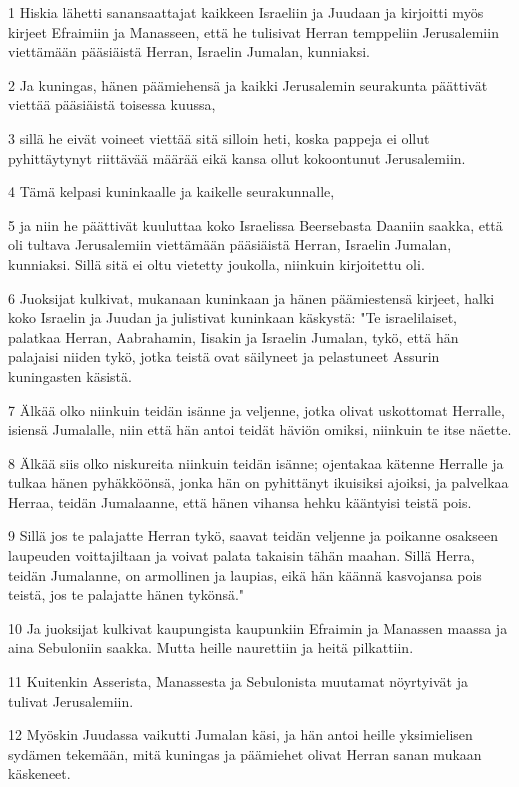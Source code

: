 \par 1 Hiskia lähetti sanansaattajat kaikkeen Israeliin ja Juudaan ja kirjoitti myös kirjeet Efraimiin ja Manasseen, että he tulisivat Herran temppeliin Jerusalemiin viettämään pääsiäistä Herran, Israelin Jumalan, kunniaksi.
\par 2 Ja kuningas, hänen päämiehensä ja kaikki Jerusalemin seurakunta päättivät viettää pääsiäistä toisessa kuussa,
\par 3 sillä he eivät voineet viettää sitä silloin heti, koska pappeja ei ollut pyhittäytynyt riittävää määrää eikä kansa ollut kokoontunut Jerusalemiin.
\par 4 Tämä kelpasi kuninkaalle ja kaikelle seurakunnalle,
\par 5 ja niin he päättivät kuuluttaa koko Israelissa Beersebasta Daaniin saakka, että oli tultava Jerusalemiin viettämään pääsiäistä Herran, Israelin Jumalan, kunniaksi. Sillä sitä ei oltu vietetty joukolla, niinkuin kirjoitettu oli.
\par 6 Juoksijat kulkivat, mukanaan kuninkaan ja hänen päämiestensä kirjeet, halki koko Israelin ja Juudan ja julistivat kuninkaan käskystä: "Te israelilaiset, palatkaa Herran, Aabrahamin, Iisakin ja Israelin Jumalan, tykö, että hän palajaisi niiden tykö, jotka teistä ovat säilyneet ja pelastuneet Assurin kuningasten käsistä.
\par 7 Älkää olko niinkuin teidän isänne ja veljenne, jotka olivat uskottomat Herralle, isiensä Jumalalle, niin että hän antoi teidät häviön omiksi, niinkuin te itse näette.
\par 8 Älkää siis olko niskureita niinkuin teidän isänne; ojentakaa kätenne Herralle ja tulkaa hänen pyhäkköönsä, jonka hän on pyhittänyt ikuisiksi ajoiksi, ja palvelkaa Herraa, teidän Jumalaanne, että hänen vihansa hehku kääntyisi teistä pois.
\par 9 Sillä jos te palajatte Herran tykö, saavat teidän veljenne ja poikanne osakseen laupeuden voittajiltaan ja voivat palata takaisin tähän maahan. Sillä Herra, teidän Jumalanne, on armollinen ja laupias, eikä hän käännä kasvojansa pois teistä, jos te palajatte hänen tykönsä."
\par 10 Ja juoksijat kulkivat kaupungista kaupunkiin Efraimin ja Manassen maassa ja aina Sebuloniin saakka. Mutta heille naurettiin ja heitä pilkattiin.
\par 11 Kuitenkin Asserista, Manassesta ja Sebulonista muutamat nöyrtyivät ja tulivat Jerusalemiin.
\par 12 Myöskin Juudassa vaikutti Jumalan käsi, ja hän antoi heille yksimielisen sydämen tekemään, mitä kuningas ja päämiehet olivat Herran sanan mukaan käskeneet.
